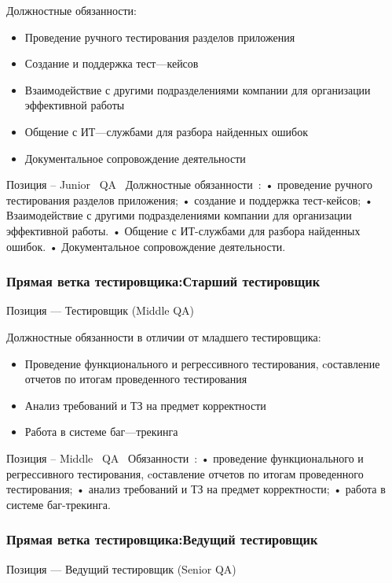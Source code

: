 \documentclass{../industrial-development}
\begin{document}
{\begin{frame}
\begin{block}{}
Должностные обязанности: 
  \end{block}
  \begin{itemize}
  \item Проведение ручного тестирования разделов приложения
  \item Создание и поддержка тест---кейсов
  \item Взаимодействие с другими подразделениями компании для организации эффективной работы
 \item Общение с ИТ---службами для разбора найденных ошибок
\item Документальное сопровождение деятельности
  \end{itemize}
\end{frame}

\lecturenotes
Позиция – Junior~\cite{hh} QA~\cite{itcf}
Должностные обязанности~\cite{rab}: 
•	проведение ручного тестирования разделов приложения;
•	создание и поддержка тест-кейсов;
•	Взаимодействие с другими подразделениями компании для организации эффективной работы.
•	Общение с ИТ-службами для разбора найденных ошибок.
•	Документальное сопровождение деятельности.

\begin{frame} \frametitle{Прямая ветка тестировщика:Старший тестировщик}
 \begin{block}{}
  \alert{Позиция --- Тестировщик (Middle QA)}

Должностные обязанности в отличии от младшего тестировщика: 
  \end{block}
  \begin{itemize}
  \item Проведение функционального и регрессивного тестирования, cоставление отчетов по итогам проведенного тестирования
  \item Анализ требований и ТЗ на предмет корректности
  \item Работа в системе баг---трекинга
  \end{itemize}
\end{frame}

\lecturenotes
Позиция – Middle~\cite{hh} QA~\cite{itcf}
Обязанности~\cite{rab}:
•	проведение функционального и регрессивного тестирования, cоставление отчетов по итогам проведенного тестирования;
•	анализ требований и ТЗ на предмет корректности;
•	работа в системе баг-трекинга.

\begin{frame} \frametitle{Прямая ветка тестировщика:Ведущий тестировщик}
 \begin{block}{}
  \alert{Позиция --- Ведущий тестировщик (Senior QA)}


\end{block}
\end{frame}}
\end{document}
